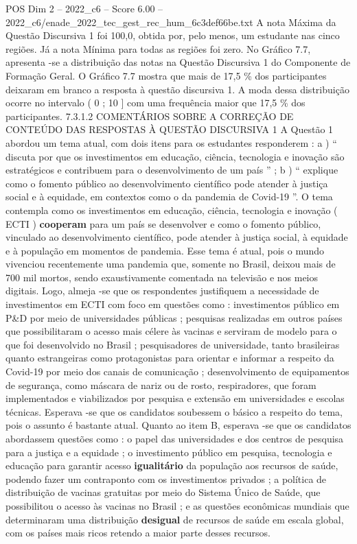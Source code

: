 \begin{textsample}{POS Dim 2 – 2022\_c6 – Score 6.00 – 2022\_c6/enade\_2022\_tec\_gest\_rec\_hum\_6c3def66be.txt}
A nota Máxima da Questão Discursiva 1 foi 100,0, obtida por, pelo menos, um estudante nas cinco regiões.
Já a nota Mínima para todas as regiões foi zero.
No Gráfico 7.7, apresenta -se a distribuição das notas na Questão Discursiva 1 do Componente de Formação Geral.
O Gráfico 7.7 mostra que mais de 17,5 \% dos participantes deixaram em branco a resposta à questão discursiva 1.
A moda dessa distribuição ocorre no intervalo ( 0 ; 10 ] com uma frequência maior que 17,5 \% dos participantes. 7.3.1.2 COMENTÁRIOS SOBRE A CORREÇÃO DE CONTEÚDO DAS RESPOSTAS À QUESTÃO DISCURSIVA 1 A Questão 1 abordou um tema atual, com dois itens para os estudantes responderem : a ) “ discuta por que os investimentos em educação, ciência, tecnologia e inovação são estratégicos e contribuem para o desenvolvimento de um país ” ; b ) “ explique como o fomento público ao desenvolvimento científico pode atender à justiça social e à equidade, em contextos como o da pandemia de Covid-19 ”.
O tema contempla como os investimentos em educação, ciência, tecnologia e inovação ( ECTI ) \textbf{cooperam} para um país se desenvolver e como o fomento público, vinculado ao desenvolvimento científico, pode atender à justiça social, à equidade e à população em momentos de pandemia.
Esse tema é atual, pois o mundo vivenciou recentemente uma pandemia que, somente no Brasil, deixou mais de 700 mil mortos, sendo exaustivamente comentada na televisão e nos meios digitais.
Logo, almeja -se que os respondentes justifiquem a necessidade de investimentos em ECTI com foco em questões como : investimentos público em P\&D por meio de universidades públicas ; pesquisas realizadas em outros países que possibilitaram o acesso mais célere às vacinas e serviram de modelo para o que foi desenvolvido no Brasil ; pesquisadores de universidade, tanto brasileiras quanto estrangeiras como protagonistas para orientar e informar a respeito da Covid-19 por meio dos canais de comunicação ; desenvolvimento de equipamentos de segurança, como máscara de nariz ou de rosto, respiradores, que foram implementados e viabilizados por pesquisa e extensão em universidades e escolas técnicas.
Esperava -se que os candidatos soubessem o básico a respeito do tema, pois o assunto é bastante atual.
Quanto ao item B, esperava -se que os candidatos abordassem questões como : o papel das universidades e dos centros de pesquisa para a justiça e a equidade ; o investimento público em pesquisa, tecnologia e educação para garantir acesso \textbf{igualitário} da população aos recursos de saúde, podendo fazer um contraponto com os investimentos privados ; a política de distribuição de vacinas gratuitas por meio do Sistema Único de Saúde, que possibilitou o acesso às vacinas no Brasil ; e as questões econômicas mundiais que determinaram uma distribuição \textbf{desigual} de recursos de saúde em escala global, com os países mais ricos retendo a maior parte desses recursos.

\end{textsample}
